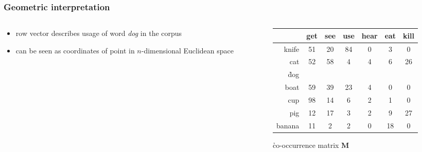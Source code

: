 \documentclass[t]{beamer} %
\begin{document}
\begin{frame}
  \frametitle{Geometric interpretation}

  \begin{columns}[T]
    \begin{column}{40mm}
      \begin{itemize}
      \item row vector  describes usage of word \emph{dog} in the corpus
      \item can be seen as coordinates of point in $n$-dimensional Euclidean space
       \end{itemize}
    \end{column}
    \begin{column}{75mm}      
      \gap[2]
      \begin{small}
        \setlength{\arrayrulewidth}{1pt}
        \begin{tabular}{r*{6}{|c}|}
          & get & see & use & hear & eat & kill \\
          \hline
          knife &  51 & 20 & 84 &  0 &  3 &  0 \\
          \hline
          cat  &  52 & 58 &  4 &  4 &  6 & 26 \\
          \hline
          \h{dog} &  &  &  &  &  &  \\
          \hline
          boat &  59 & 39 & 23 &  4 &  0 &  0 \\
          \hline
          cup  &  98 & 14 &  6 &  2 &  1 &  0 \\
          \hline
          pig  &  12 & 17 &  3 &  2 &  9 & 27 \\
          \hline
          banana & 11 &  2 &  2 &  0 & 18 &  0 \\
          \hline
        \end{tabular}
      \end{small}

      \begin{center}
        \h{co-occurrence matrix} $\mathbf{M}$
      \end{center}
    \end{column}
  \end{columns}
\end{frame}
\end{document}
